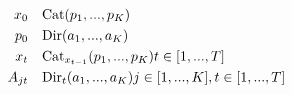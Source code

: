 $$
\begin{align*}
x_0 &\text{ ~ Cat}(p_1, ..., p_K) \\
p_0 &\text{ ~ Dir}(a_1, ..., a_K) \\
x_t &\text{ ~ Cat}_{x_{t-1}}(p_1, ..., p_K) \space\space\space\space t \in [1, ..., T] \\
A_{jt} &\text{ ~ Dir}_{t}(a_1, ..., a_K) \space\space\space\space j \in [1, ..., K], \space\space t \in [1, ..., T]
\end{align*}
$$